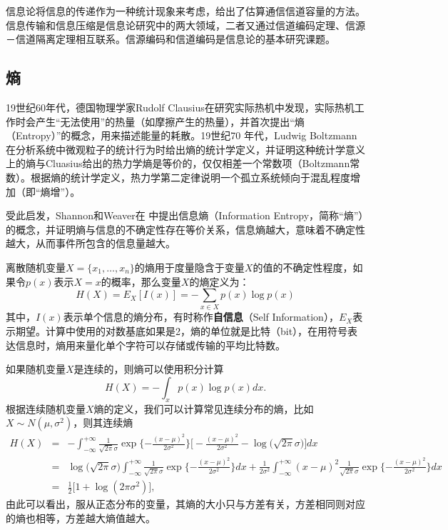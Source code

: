 信息论将信息的传递作为一种统计现象来考虑，给出了估算通信信道容量的方法。信息传输和信息压缩是信息论研究中的两大领域，二者又通过信道编码定理、信源－信道隔离定理相互联系。信源编码和信道编码是信息论的基本研究课题。

\subsection{熵}
19世纪60年代，德国物理学家Rudolf Clausius在研究实际热机中发现，实际热机工作时会产生“无法使用”的热量（如摩擦产生的热量），并首次提出“熵
（Entropy）”的概念，用来描述能量的耗散。19世纪70 年代，Ludwig Boltzmann在分析系统中微观粒子的统计行为时给出熵的统计学定义，并证明这种统计学意义上的熵与Cluasius给出的热力学熵是等价的，仅仅相差一个常数项（Boltzmann常数）。根据熵的统计学定义，热力学第二定律说明一个孤立系统倾向于混乱程度增加（即“熵增”）。

受此启发，Shannon和Weaver在\cite{shannon1948mathematical} 中提出信息熵（Information Entropy，简称“熵”）的概念，并证明熵与信息的不确定性存在等价关系，信息熵越大，意味着不确定性越大，从而事件所包含的信息量越大。

离散随机变量$X=\{x_1,\ldots,x_n\}$的熵用于度量隐含于变量$X$的值的不确定性程度，如果令$p(x)$表示$X=x$的概率，那么变量$X$的熵定义为：
\begin{equation}\label{eq:entropy}
  H(X) = E_X[I(x)] = -\sum_{x\in X}{p(x)\log p(x)}
\end{equation}
其中，$I(x)$表示单个信息的熵分布，有时称作\textbf{自信息}（Self Information），$E_X$表示期望。计算中使用的对数基底如果是2，熵的单位就是比特（bit），在用符号表达信息时，熵用来量化单个字符可以存储或传输的平均比特数。

如果随机变量$X$是连续的，则熵可以使用积分计算
\begin{equation}\label{eq:continualentropy}
  H(X) = -\int_x{p(x)\log p(x)}dx.
\end{equation}
根据连续随机变量$X$熵的定义，我们可以计算常见连续分布的熵，比如$X\sim N(\mu,\sigma^2)$，则其连续熵
\[
\begin{array}{lcl}
    H(X) &=& -\int_{-\infty}^{+\infty} \frac{1}{\sqrt{2\pi}\sigma} \exp\{-\frac{(x-\mu)^2}{2\sigma^2}\} \big[-\frac{(x-\mu)^2}{2\sigma^2} - \log \big(\sqrt{2\pi}\sigma\big)\big]dx\\
    &=&\log \big(\sqrt{2\pi}\sigma\big) \int_{-\infty}^{+\infty} \frac{1}{\sqrt{2\pi}\sigma} \exp\{-\frac{(x-\mu)^2}{2\sigma^2}\} dx + \frac{1}{2\sigma^2} \int_{-\infty}^{+\infty}(x-\mu)^2 \frac{1}{\sqrt{2\pi}\sigma} \exp\{-\frac{(x-\mu)^2}{2\sigma^2}\} dx\\
    &=& \frac{1}{2} \big[1 + \log(2\pi \sigma^2)\big],
\end{array}
\]
由此可以看出，服从正态分布的变量，其熵的大小只与方差有关，方差相同则对应的熵也相等，方差越大熵值越大。

